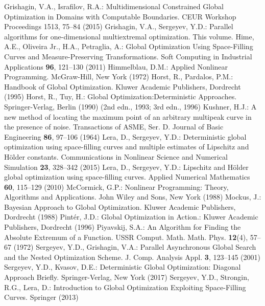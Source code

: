 \begin{thebibliography}{99.}
 Grishagin, V.A., Israfilov, R.A.: Multidimensional Constrained Global Optimization in Domains with Computable Boundaries. CEUR Workshop Proceedings 1513, 75--84 (2015)
 Grishagin, V.A., Sergeyev, Y.D.: Parallel algorithms for one-dimensional multiextremal optimization. This volume.
	Hime, A.E., Oliveira Jr., H.A., Petraglia, A.: Global Optimization Using Space-Filling Curves and Measure-Preserving Transformations. Soft Computing in Industrial Applications \textbf{96}, 121--130 (2011)
	Himmelblau, D.M.: Applied Nonlinear Programming. McGraw-Hill, New York (1972)
	Horst, R., Pardalos, P.M.: Handbook of Global Optimization. Kluwer Academic Publishers, Dordrecht (1995)
	Horst, R., Tuy, H.: Global Optimization:Deterministic Approaches. Springer-Verlag, Berlin (1990) (2nd edn., 1993; 3rd edn., 1996)
	Kushner, H.J.: A new method of locating the maximum point of an arbitrary multipeak curve in the presence of noise. Transactions of ASME, Ser. D. Journal of Basic Engineering \textbf{86}, 97--106 (1964)
	Lera, D., Sergeyev, Y.D.: Deterministic global optimization using space-filling curves and multiple estimates of Lipschitz and H{\"o}lder constants. Communications in Nonlinear Science and Numerical Simulation \textbf{23}, 328--342 (2015)
	Lera, D., Sergeyev, Y.D.: Lipschitz and H{\"o}lder global optimization using space-filling curves. Applied Numerical Mathematics \textbf{60}, 115--129 (2010) 
	McCormick, G.P.: Nonlinear Programming: Theory, Algorithms and Applications. John Wiley and Sons, New York (1988)
	Mockus, J.: Bayesian Approach to Global Optimization. Kluwer Academic Publishers, Dordrecht (1988) 
	Pint{\'e}r, J.D.: Global Optimization in Action.: Kluwer Academic Publishers, Dordrecht (1996) 
	Piyavskij, S.A.: An Algorithm for Finding the Absolute Extremum of a Function. USSR Comput. Math. Math. Phys. \textbf{12}(4), 57--67 (1972)
	Sergeyev, Y.D., Grishagin, V.A.: Parallel Asynchronous Global Search and the Nested Optimization Scheme. J. Comp. Analysis Appl. \textbf{3}, 123--145 (2001)
	Sergeyev, Y.D., Kvasov, D.E.: Deterministic Global Optimization: Diagonal Approach Briefly. Springer-Verlag, New York (2017)
	Sergeyev, Y.D., Strongin, R.G., Lera, D.: Introduction to Global Optimization Exploiting Space-Filling Curves. Springer (2013)

\end{thebibliography}
